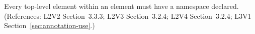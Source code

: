 Every top-level element within an  element must have a
namespace declared.  (References: L2V2 Section~3.3.3;
L2V3 Section~3.2.4; L2V4 Section~3.2.4; L3V1 Section~\ref{sec:annotation-use}.)
